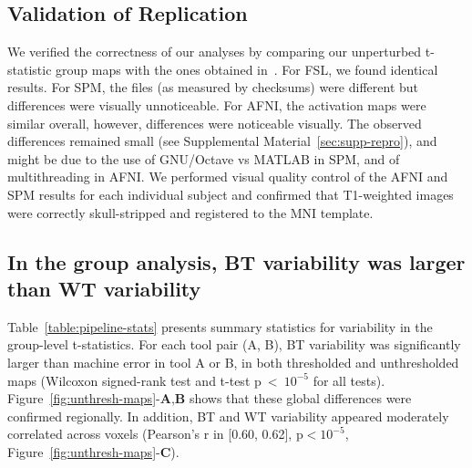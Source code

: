\documentclass[11pt,onecolumn]{article}
\begin{document}
\subsection{Validation of Replication}

We verified the correctness of our analyses by comparing our unperturbed
t-statistic group maps with the ones obtained
in~\cite{bowring2019exploring}. For FSL, we found
identical results. For SPM, the files (as measured by checksums) were different but differences
were visually unnoticeable. For AFNI, the activation maps were similar
overall, however, differences were noticeable visually.
The observed differences remained small (see Supplemental Material~\ref{sec:supp-repro}), and might be due to the use of
GNU/Octave vs MATLAB in SPM, and of multithreading in AFNI. We performed visual quality control of the AFNI
and SPM results for each individual subject and confirmed that T1-weighted images were
correctly skull-stripped and registered to the MNI template.

\subsection{In the group analysis, BT variability was larger than WT variability}

Table~\ref{table:pipeline-stats} presents summary statistics for variability in the
group-level t-statistics. For each tool pair (A, B), BT variability was
significantly larger than machine error in tool A or B, in both thresholded
and unthresholded maps (Wilcoxon signed-rank test and t-test p~\textless~$10^{-5}$ for all tests).
Figure~\ref{fig:unthresh-maps}-\textbf{A},\textbf{B} shows that
these global differences were confirmed regionally.
In addition, BT and WT variability appeared moderately correlated across voxels (Pearson's r
in [0.60, 0.62], p$< 10^{-5}$, Figure~\ref{fig:unthresh-maps}-\textbf{C}). 
\end{document}

